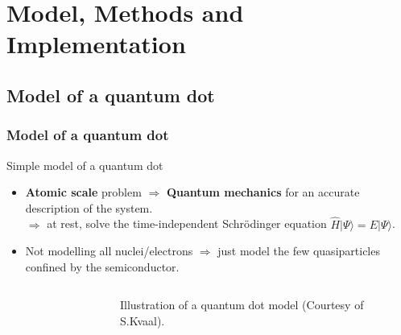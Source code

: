 \documentclass[xcolor=pdftex,hyperref={pdfpagelabels=false},table]{beamer}
\begin{document}
\section{Model, Methods and Implementation}
\subsection{Model of a quantum dot}
\begin{frame}
\frametitle{Model of a quantum dot}
\begin{block}{Simple model of a quantum dot}
\scriptsize
\begin{itemize}
\item \textbf{Atomic scale} problem $\Rightarrow$ \textbf{Quantum mechanics} for an accurate description of the system.\\ $\Rightarrow$ at rest, solve the time-independent Schr\"odinger equation $\hat{H} |\Psi \rangle=E |\Psi \rangle$.
 \item Not modelling all nuclei/electrons %
$\Rightarrow$ just model the few quasiparticles confined by the semiconductor. %
\end{itemize}
  \end{block}

\begin{columns}[T,l]
\column{5.5cm}
\begin{figure}
	\begin{center}
	\end{center}
\end{figure}
\column{5.5cm}
\begin{figure}
	\begin{center}
	\end{center}
	\caption{Illustration of a quantum dot model \newline (Courtesy of S.Kvaal\cite{SimenThesis}).}
\end{figure}

\end{columns}
\end{frame}
\end{document}
